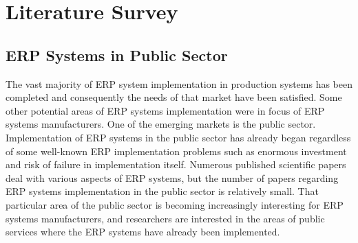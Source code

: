 \section[Literature Survey]{\textbf{Literature Survey}}


\subsection{ERP Systems in Public Sector}

The vast majority of ERP system implementation in
production systems has been completed and consequently
the needs of that market have been satisfied. Some other
potential areas of ERP systems implementation were in
focus of ERP systems manufacturers. One of the emerging
markets is the public sector. Implementation of ERP
systems in the public sector has already began regardless
of some well-known ERP implementation problems such
as enormous investment and risk of failure in
implementation itself. Numerous published scientific
papers deal with various aspects of ERP systems, but the
number of papers regarding ERP systems implementation
in the public sector is relatively small. That particular area
of the public sector is becoming increasingly interesting for
ERP systems manufacturers, and researchers are interested
in the areas of public services where the ERP systems have
already been implemented. \cite*[]{Robert2014}

